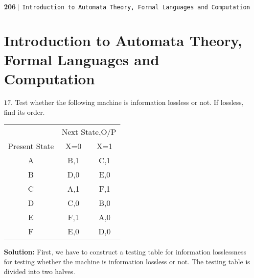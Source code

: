 \documentclass[a4,9pt]{beamer}
\begin{document}
\begin{frame}
 \begin{flushleft}
    \textbf{206}\hspace*{0.1cm} \textbf{$|$} \hspace*{0.1cm} {\small \texttt{Introduction to Automata Theory, Formal Languages and Computation}}
  \end{flushleft}
\section*{Introduction to Automata Theory, Formal Languages and Computation}
\vspace*{0.5cm}

\pause
$17.$ Test whether the following machine is information lossless or not. If lossless, find its order.

\vspace*{0.1cm}
\pause
\begin{center}
\begin{tabular}{ccc}
 \hline

 \hline

 \hline

 \hline
 & \multicolumn{2}{c}{Next State,O/P}\\
 \cline{2-3}
Present State & X=0           &   X=1\\
\hline
    A    &  B,1  & C,1 \\
    B    &  D,0  & E,0 \\
    C    &  A,1  & F,1 \\
    D    &  C,0  & B,0 \\
    E    &  F,1  & A,0 \\
    F    &  E,0  & D,0 \\
 \hline

 \hline

 \hline

 \hline
\end{tabular}
\end{center}

\pause
\large{\textbf{Solution:}} \small{First, we have to construct a testing table for information losslessness for testing whether the machine is information lossless or not. The testing table is divided into two halves.}
\end{frame}
\end{document}
